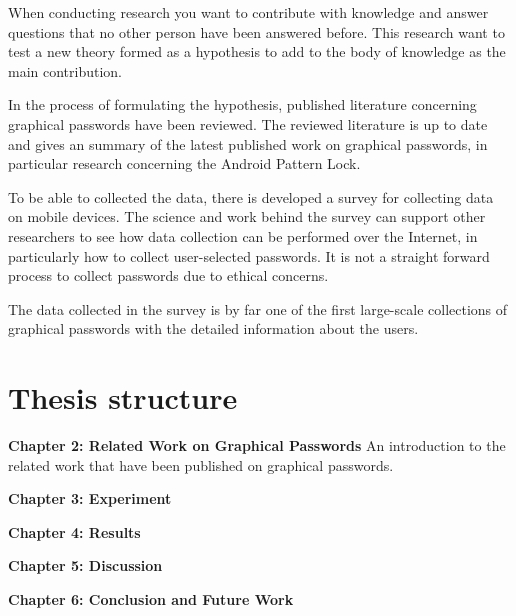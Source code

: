 		When conducting research you want to contribute with knowledge and answer questions that no other person have been answered before. This research want to test a new theory formed as a hypothesis to add to the body of knowledge as the main contribution.

		In the process of formulating the hypothesis, published literature concerning graphical passwords have been reviewed. The reviewed literature is up to date and gives an summary of the latest published work on graphical passwords, in particular research concerning the Android Pattern Lock. 

		To be able to collected the data, there is developed a survey for collecting data on mobile devices. The science and work behind the survey can support other researchers to see how data collection can be performed over the Internet, in particularly how to collect user-selected passwords. It is not a straight forward process to collect passwords due to ethical concerns. 

		The data collected in the survey is by far one of the first large-scale collections of graphical passwords with the detailed information about the users.

	\section{Thesis structure} \label{sec:structure}

		{\bf Chapter 2: Related Work on Graphical Passwords}
		An introduction to the related work that have been published on graphical passwords. 

    {\bf Chapter 3: Experiment}

    {\bf Chapter 4: Results}

    {\bf Chapter 5: Discussion}

    {\bf Chapter 6: Conclusion and Future Work}

